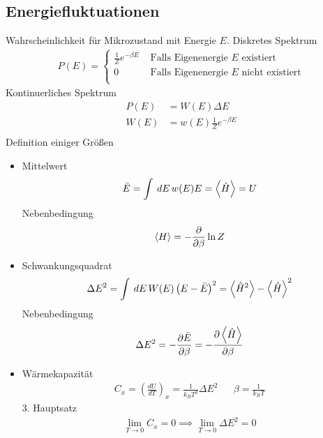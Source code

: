 \subsection*{Energiefluktuationen}
Wahrscheinlichkeit f\"ur Mikrozustand mit Energie $E$.
Diskretes Spektrum 
%
\begin{align*}
  P(E) = 
  \begin{cases}
    \frac{1}{Z} e ^{-\beta E} & \text{ Falls Eigenenergie $E$ existiert} \\
    0                         & \text{ Falls Eigenenergie $E$ nicht existiert} \\
  \end{cases}
  \end{align*}
%
Kontinuerliches Spektrum 
%
\begin{align*}
  P(E) & = W(E) \Delta E \\
  W(E) & = w(E) \frac{1}{Z} e^{-\beta E} \\
\end{align*}
%
Definition einiger Gr\"o\ss{}en
\begin{itemize}
  \item Mittelwert 
    \begin{align*}
      \bar{E} = \int_{}^{} \,dE\, w(E) E = \Braket{\hat{H}} = U
    \end{align*}
    Nebenbedingung
    \begin{align*}
      \Braket{H} = -\frac{\partial  }{\partial \beta} \ln{Z} 
    \end{align*}
  \item Schwankungsquadrat 
    \begin{align*}
      \Delta E ^2 = \int_{}^{} \,dE\, W(E) \left( E- \bar{E} \right) ^2 
      = \Braket{\hat{H}^2} - \Braket{\hat{H}} ^2
    \end{align*}
    Nebenbedingung
    \begin{align*}
      \Delta E^2 = - \frac{\partial \bar{E} }{\partial \beta} = - \frac{\partial \Braket{\hat{H}} }{\partial \beta}
    \end{align*}
  \item W\"armekapazit\"at 
    \begin{align*}
      C_x = \left( \frac{dU}{dT} \right)_x = \frac{1}{k_B T^2} \Delta E^2 &&
      \beta = \frac{1}{k_B T}
    \end{align*}
    3. Hauptsatz
    \begin{align*}
      \lim_{T \to  0} C_x = 0 \implies \lim_{T\to  0 } \Delta E^2 = 0 
    \end{align*}
\end{itemize}
